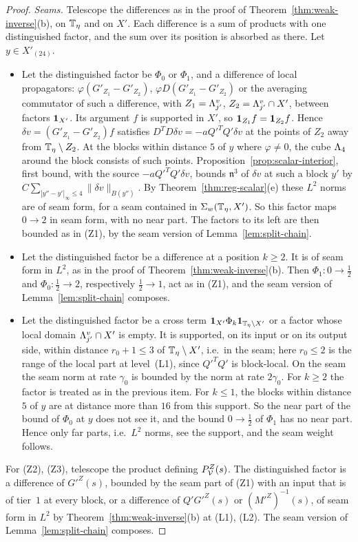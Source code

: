 \begin{proof}
\emph{Seams.} Telescope the differences as in the proof of Theorem~\ref{thm:weak-inverse}(b), on $\mathbb T_\eta$ and on $X'$. Each difference is a sum of products with one distinguished factor, and the sum over its position is absorbed as there. Let $y\in X'_{(24)}$.
\begin{itemize}
\item Let the distinguished factor be $\Phi_0$ or $\Phi_1$, and a difference of local propagators: $\varphi(G'_{Z_1}-G'_{Z_2})$, $\varphi D(G'_{Z_1}-G'_{Z_2})$ or the averaging commutator of such a difference, with $Z_1=\Lambda^v_{j'}$, $Z_2=\Lambda^v_{j'}\cap X'$, between factors $\mathbf 1_{X'}$. Its argument $f$ is supported in $X'$, so $\mathbf 1_{Z_1}f=\mathbf 1_{Z_2}f$. Hence $\delta v=(G'_{Z_1}-G'_{Z_2})f$ satisfies $D^TD\delta v=-aQ'^TQ'\delta v$ at the points of $Z_2$ away from $\mathbb T_\eta\setminus Z_2$. At the blocks within distance $5$ of $y$ where $\varphi\ne0$, the cube $\Lambda_4$ around the block consists of such points. Proposition~\ref{prop:scalar-interior}, first bound, with the source $-aQ'^TQ'\delta v$, bounds $\mathfrak n^3$ of $\delta v$ at such a block $y'$ by $C\sum_{|y''-y'|_\infty\le4}\|\delta v\|_{B(y'')}$. By Theorem~\ref{thm:reg-scalar}(e) these $L^2$ norms are of seam form, for a seam contained in $\Sigma_w(\mathbb T_\eta,X')$. So this factor maps $0\to2$ in seam form, with no near part. The factors to its left are then bounded as in (Z1), by the seam version of Lemma~\ref{lem:split-chain}.
\item Let the distinguished factor be a difference at a position $k\ge2$. It is of seam form in $L^2$, as in the proof of Theorem~\ref{thm:weak-inverse}(b). Then $\Phi_1\colon0\to\frac12$ and $\Phi_0\colon\frac12\to2$, respectively $\frac12\to1$, act as in (Z1), and the seam version of Lemma~\ref{lem:split-chain} composes.
\item Let the distinguished factor be a cross term $\mathbf 1_{X'}\Phi_k\mathbf 1_{\mathbb T_\eta\setminus X'}$ or a factor whose local domain $\Lambda^v_{j'}\cap X'$ is empty. It is supported, on its input or on its output side, within distance $r_0+1\le3$ of $\mathbb T_\eta\setminus X'$, i.e.\ in the seam; here $r_0\le2$ is the range of the local part at level~(L1), since $Q'^TQ'$ is block-local. On the seam the seam norm at rate $\gamma_0$ is bounded by the norm at rate $2\gamma_0$. For $k\ge2$ the factor is treated as in the previous item. For $k\le1$, the blocks within distance $5$ of $y$ are at distance more than $16$ from this support. So the near part of the bound of $\Phi_0$ at $y$ does not see it, and the bound $0\to\frac12$ of $\Phi_1$ has no near part. Hence only far parts, i.e.\ $L^2$ norms, see the support, and the seam weight follows.
\end{itemize}
For (Z2), (Z3), telescope the product defining $P^Z_\mathcal V(s)$. The distinguished factor is a difference of $G'^Z(s)$, bounded by the seam part of (Z1) with an input that is of tier~$1$ at every block, or a difference of $Q'G'^Z(s)$ or $(M'^Z)^{-1}(s)$, of seam form in $L^2$ by Theorem~\ref{thm:weak-inverse}(b) at (L1), (L2). The seam version of Lemma~\ref{lem:split-chain} composes.


\end{proof}
